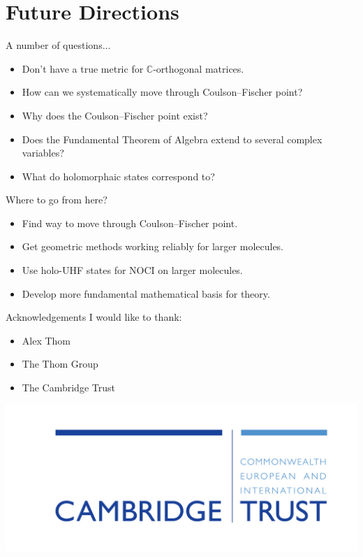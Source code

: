 \documentclass{beamer}
\begin{document}
\section{Future Directions}
\begin{frame}{A number of questions...}
 \begin{itemize}
  \item{Don't have a true metric for $\mathbb{C}$-orthogonal matrices.}
  \item{How can we systematically move through Coulson--Fischer point?}
  \item{Why does the Coulson--Fischer point exist?}
  \item{Does the Fundamental Theorem of Algebra extend to several complex variables?}
  \item{What do holomorphaic states correspond to?}
 \end{itemize}
\end{frame}

\begin{frame}{Where to go from here?}
 \begin{itemize}
   \item{Find way to move through Coulson--Fischer point.}
   \item{Get geometric methods working \alert{reliably} for larger molecules.}
   \item{Use holo-UHF states for NOCI on larger molecules.}
   \item{Develop more fundamental mathematical basis for theory.}
 \end{itemize}
\end{frame}

\begin{frame}{Acknowledgements}
 I would like to thank:
 \begin{itemize}
  \item{Alex Thom}
  \item{The Thom Group}
  \item{The Cambridge Trust}
 \end{itemize}
 \begin{center}
  \includegraphics[scale=0.7]{template/CT_logo.jpg}
 \end{center}
\end{frame}
\end{document}
